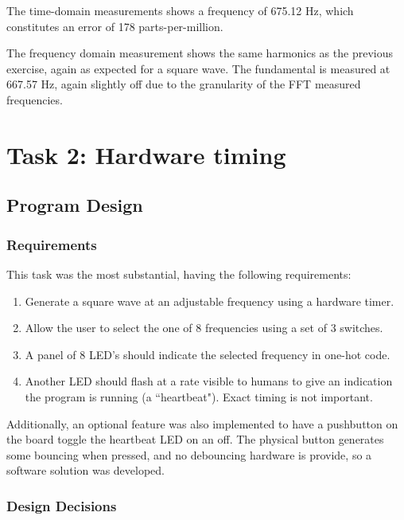 \documentclass[11pt]{article}
\begin{document}
The time-domain measurements shows a frequency of 675.12 Hz, which constitutes an error of 178 parts-per-million.

The frequency domain measurement shows the same harmonics as the previous exercise, again as expected for a square wave. The fundamental is measured at 667.57 Hz, again slightly off due to the granularity of the FFT measured frequencies.

\section{Task 2: Hardware timing}


\subsection{Program Design}

\subsubsection{Requirements}
This task was the most substantial, having the following requirements:
\begin{enumerate}
    \item Generate a square wave at an adjustable frequency using a hardware timer.
    \item Allow the user to select the one of 8 frequencies using a set of 3 switches.
    \item A panel of 8 LED's should indicate the selected frequency in one-hot code.
    \item Another LED should flash at a rate visible to humans to give an indication the program is running (a ``heartbeat"). Exact timing is not important.
\end{enumerate}

Additionally, an optional feature was also implemented to have a pushbutton on the board toggle the heartbeat LED on an off. The physical button generates some bouncing when pressed, and no debouncing hardware is provide, so a software solution was developed.

\subsubsection{Design Decisions}
\end{document}
